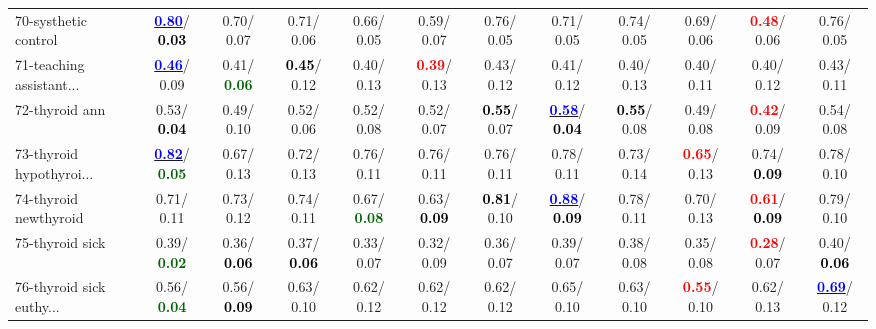 \begin{table}[h]
\begin{center}
{\begin{tabular}{lc|c|c|c|c|c|c|c|c|c|c}
70-systhetic control & \underline{\textcolor{blue}{\textbf{  0.80}}}/\textcolor{black}{\textbf{  0.03}} &   0.70/  0.07 &   0.71/  0.06 &   0.66/  0.05 &   0.59/  0.07 &   0.76/  0.05 &   0.71/  0.05 &   0.74/  0.05 &   0.69/  0.06 & \textcolor{red}{\textbf{  0.48}}/  0.06 &   0.76/  0.05 \\
71-teaching assistant... & \underline{\textcolor{blue}{\textbf{  0.46}}}/  0.09 &   0.41/\textcolor{darkgreen}{\textbf{  0.06}} & \textcolor{black}{\textbf{  0.45}}/  0.12 &   0.40/  0.13 & \textcolor{red}{\textbf{  0.39}}/  0.13 &   0.43/  0.12 &   0.41/  0.12 &   0.40/  0.13 &   0.40/  0.11 &   0.40/  0.12 &   0.43/  0.11 \\ \hline
72-thyroid ann &   0.53/\textcolor{black}{\textbf{  0.04}} &   0.49/  0.10 &   0.52/  0.06 &   0.52/  0.08 &   0.52/  0.07 & \textcolor{black}{\textbf{  0.55}}/  0.07 & \underline{\textcolor{blue}{\textbf{  0.58}}}/\textcolor{black}{\textbf{  0.04}} & \textcolor{black}{\textbf{  0.55}}/  0.08 &   0.49/  0.08 & \textcolor{red}{\textbf{  0.42}}/  0.09 &   0.54/  0.08 \\
73-thyroid hypothyroi... & \underline{\textcolor{blue}{\textbf{  0.82}}}/\textcolor{darkgreen}{\textbf{  0.05}} &   0.67/  0.13 &   0.72/  0.13 &   0.76/  0.11 &   0.76/  0.11 &   0.76/  0.11 &   0.78/  0.11 &   0.73/  0.14 & \textcolor{red}{\textbf{  0.65}}/  0.13 &   0.74/\textcolor{black}{\textbf{  0.09}} &   0.78/  0.10 \\
74-thyroid newthyroid &   0.71/  0.11 &   0.73/  0.12 &   0.74/  0.11 &   0.67/\textcolor{darkgreen}{\textbf{  0.08}} &   0.63/\textcolor{black}{\textbf{  0.09}} & \textcolor{black}{\textbf{  0.81}}/  0.10 & \underline{\textcolor{blue}{\textbf{  0.88}}}/\textcolor{black}{\textbf{  0.09}} &   0.78/  0.11 &   0.70/  0.13 & \textcolor{red}{\textbf{  0.61}}/\textcolor{black}{\textbf{  0.09}} &   0.79/  0.10 \\
75-thyroid sick &   0.39/\textcolor{darkgreen}{\textbf{  0.02}} &   0.36/\textcolor{black}{\textbf{  0.06}} &   0.37/\textcolor{black}{\textbf{  0.06}} &   0.33/  0.07 &   0.32/  0.09 &   0.36/  0.07 &   0.39/  0.07 &   0.38/  0.08 &   0.35/  0.08 & \textcolor{red}{\textbf{  0.28}}/  0.07 &   0.40/\textcolor{black}{\textbf{  0.06}} \\
76-thyroid sick euthy... &   0.56/\textcolor{darkgreen}{\textbf{  0.04}} &   0.56/\textcolor{black}{\textbf{  0.09}} &   0.63/  0.10 &   0.62/  0.12 &   0.62/  0.12 &   0.62/  0.12 &   0.65/  0.10 &   0.63/  0.10 & \textcolor{red}{\textbf{  0.55}}/  0.10 &   0.62/  0.13 & \underline{\textcolor{blue}{\textbf{  0.69}}}/  0.12 \\

\end{tabular}}
\end{center}
\end{table}
